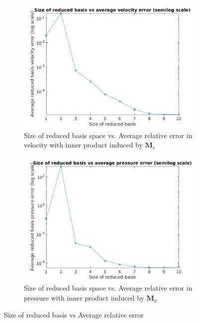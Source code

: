 \documentclass[graybox]{svmult}
\begin{document}
\begin{figure}[H]
\begin{subfigure}{0.48\textwidth}
\includegraphics[width=\linewidth]{size_vs_average_reduced_basis_velocity_error_semilog.jpg}
\caption{Size of reduced basis space vs. Average relative error in velocity with inner product induced by $\bm{M}_v$} \label{error_vs_basis_velocity}
\end{subfigure}\hspace*{\fill}
\begin{subfigure}{0.48\textwidth}
\includegraphics[width=\linewidth]{size_vs_average_reduced_basis_pressure_error_semilog.jpg}
\caption{Size of reduced basis space vs. Average relative error in pressure with inner product induced by $\bm{M}_p$} \label{error_vs_basis_pressure}
\end{subfigure}
  \caption{Size of reduced basis vs Average relative error} 
\label{error_vs_basis}
\end{figure}
\end{document}

